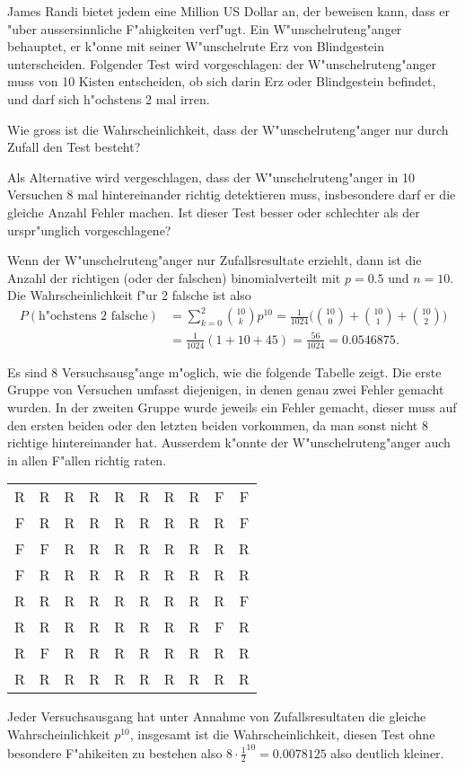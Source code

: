 James Randi bietet jedem eine Million US Dollar an, der beweisen kann,
dass er "uber aussersinnliche F"ahigkeiten verf"ugt. Ein W"unschelruteng"anger
behauptet, er k"onne mit seiner W"unschelrute Erz von Blindgestein
unterscheiden. Folgender Test wird vorgeschlagen: der W"unschelruteng"anger
muss von 10 Kisten entscheiden, ob sich darin Erz oder Blindgestein
befindet, und darf sich h"ochstens 2 mal irren.
\begin{teilaufgaben}
\item
Wie gross ist die
Wahrscheinlichkeit, dass der W"unschelruteng"anger nur durch Zufall
den Test besteht?
\item
Als Alternative wird vergeschlagen, dass der W"unschelruteng"anger
in 10 Versuchen
8 mal hintereinander richtig detektieren muss, insbesondere darf
er die gleiche Anzahl Fehler machen.
Ist dieser Test
besser oder schlechter als der urspr"unglich vorgeschlagene?
\end{teilaufgaben}

\begin{loesung}
\begin{teilaufgaben}
\item Wenn der W"unschelruteng"anger nur Zufallsresultate erziehlt,
dann ist die Anzahl der richtigen (oder der falschen) binomialverteilt
mit $p=0.5$ und $n=10$. Die Wahrscheinlichkeit f"ur 2 falsche ist also
\begin{align*}
P(\text{h"ochstens 2 falsche})&=\sum_{k=0}^2 \binom{10}{k}p^{10}
=
\frac1{1024}\biggl(
\binom{10}{0}
+
\binom{10}{1}
+
\binom{10}{2}
\biggr)
\\
&=
\frac1{1024}( 1 + 10 + 45)
=\frac{56}{1024}=0.0546875.
\end{align*}
\item Es sind 8 Versuchsausg"ange m"oglich, wie die folgende Tabelle
zeigt. Die erste Gruppe von Versuchen umfasst diejenigen, in denen
genau zwei Fehler gemacht wurden. In der zweiten Gruppe wurde jeweils
ein Fehler gemacht, dieser muss auf den ersten beiden oder den letzten
beiden vorkommen, da man sonst nicht 8 richtige hintereinander hat.
Ausserdem k"onnte der W"unschelruteng"anger auch in allen F"allen richtig
raten.
\begin{center}
\begin{tabular}{cccccccccc}
R&R&R&R&R&R&R&R&F&F\\
F&R&R&R&R&R&R&R&R&F\\
F&F&R&R&R&R&R&R&R&R\\
\hline
F&R&R&R&R&R&R&R&R&R\\
R&R&R&R&R&R&R&R&R&F\\
R&R&R&R&R&R&R&R&F&R\\
R&F&R&R&R&R&R&R&R&R\\
\hline
R&R&R&R&R&R&R&R&R&R
\end{tabular}
\end{center}
Jeder Versuchsausgang hat unter Annahme von Zufallsresultaten die gleiche
Wahrscheinlichkeit
$p^{10}$, insgesamt ist die Wahrscheinlichkeit, diesen Test ohne
besondere F"ahikeiten zu bestehen also $8\cdot \frac12^{10}=0.0078125$
also deutlich kleiner.
\end{teilaufgaben}
\end{loesung}

